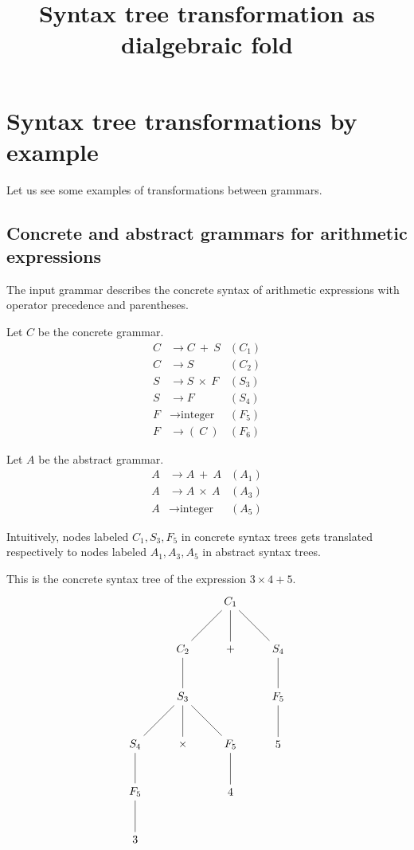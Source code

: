 \documentclass{amsart}
\gdef\R{\rightarrow}
\begin{document}
\null
{}
\title{Syntax tree transformation as dialgebraic fold}
\maketitle
{}

\section{Syntax tree transformations by example}

Let us see some examples of transformations between grammars.

\subsection{Concrete and abstract grammars for arithmetic expressions}

The input grammar describes the concrete syntax of arithmetic
expressions with operator precedence and parentheses.

Let $C$ be the concrete grammar.
\begin{align*}
C &\R C~+~S & (C_1) \\
C &\R S     & (C_2) \\
S &\R S~\times~F & (S_3) \\
S &\R F     & (S_4) \\
F &\R \mbox{integer} & (F_5) \\
F &\R (~C~) & (F_6)
\end{align*}

Let $A$ be the abstract grammar.
\begin{align*}
A &\R A~+~A & (A_1) \\
A &\R A~\times~A & (A_3) \\
A &\R \mbox{integer} & (A_5)
\end{align*}

Intuitively, nodes labeled $C_1,S_3,F_5$ in concrete syntax trees
gets translated respectively to nodes labeled $A_1,A_3,A_5$ in
abstract syntax trees.

This is the concrete syntax tree of the expression $3\times4+5$.
\[
\begin{tikzpicture}
\path node{$C_1$}
child { node{$C_2$}
  child { node{$S_3$}
    child { node{$S_4$} child { node{$F_5$} child { node{$3$} }}}
    child { node{$\times$} }
    child { node{$F_5$} child { node{$4$} } }
  }
}
child { node{$+$} }
child{ node{$S_4$} child{ node{$F_5$} child{ node{$5$} }}}
;
\end{tikzpicture}
\]
\end{document}
